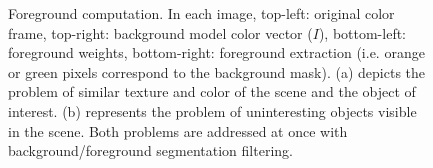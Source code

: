 \documentclass[10pt,letterpaper]{article}
\begin{document}
\begin{figure}[h]
     \begin{center}
        \end{center}

    \caption{Foreground computation. In each image, top-left: original color frame, top-right: background model color vector ($I$), bottom-left: foreground weights, bottom-right: foreground extraction (i.e. orange or green pixels correspond to the background mask). (a) depicts the problem of similar texture and color of the scene and the object of interest. (b) represents the problem of uninteresting objects visible in the scene. Both problems are addressed at once with background/foreground segmentation filtering.}
   \label{fig:subfigures}
\end{figure}
\end{document}
